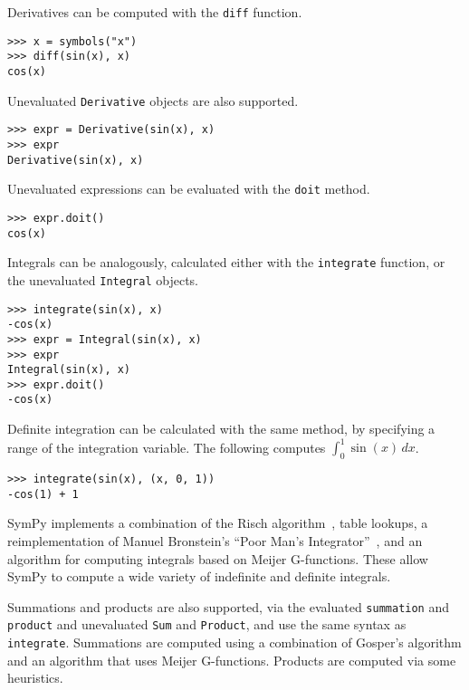 

Derivatives can be computed with the \verb|diff| function.
\begin{verbatim}
>>> x = symbols("x")
>>> diff(sin(x), x)
cos(x)
\end{verbatim}

Unevaluated \verb|Derivative| objects are also supported.
\begin{verbatim}
>>> expr = Derivative(sin(x), x)
>>> expr
Derivative(sin(x), x)
\end{verbatim}

Unevaluated expressions can be evaluated with the \verb|doit| method.
\begin{verbatim}
>>> expr.doit()
cos(x)
\end{verbatim}

Integrals can be analogously, calculated either with the \verb|integrate|
function, or the unevaluated \verb|Integral| objects.
\begin{verbatim}
>>> integrate(sin(x), x)
-cos(x)
>>> expr = Integral(sin(x), x)
>>> expr
Integral(sin(x), x)
>>> expr.doit()
-cos(x)
\end{verbatim}
Definite integration can be calculated with the same method, by specifying a
range of the integration variable. The following computes $\int_0^1\sin(x)\,dx$.
\begin{verbatim}
>>> integrate(sin(x), (x, 0, 1))
-cos(1) + 1
\end{verbatim}

SymPy implements a combination of the Risch
algorithm~\cite{bronstein2005integration}, table lookups, a reimplementation
of Manuel Bronstein's ``Poor Man's Integrator''~\cite{Bronstein2005pmint}, and
an algorithm for computing integrals based on Meijer G-functions. These allow
SymPy to compute a wide variety of indefinite and definite integrals.

Summations and products are also supported, via the evaluated \verb|summation|
and \verb|product| and unevaluated \verb|Sum| and \verb|Product|, and use the
same syntax as \verb|integrate|. Summations are computed using a combination
of Gosper's algorithm and an algorithm that uses Meijer G-functions. Products
are computed via some heuristics.

